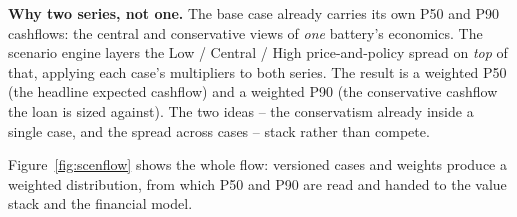 \begin{plainnote}
\textbf{Why two series, not one.} The base case already carries its own P50 and P90 cashflows: the central and conservative views of \emph{one} battery's economics. The scenario engine layers the Low / Central / High price-and-policy spread on \emph{top} of that, applying each case's multipliers to both series. The result is a weighted P50 (the headline expected cashflow) and a weighted P90 (the conservative cashflow the loan is sized against). The two ideas -- the conservatism already inside a single case, and the spread across cases -- stack rather than compete.
\end{plainnote}

Figure~\ref{fig:scenflow} shows the whole flow: versioned cases and weights produce a weighted distribution, from which P50 and P90 are read and handed to the value stack and the financial model.

